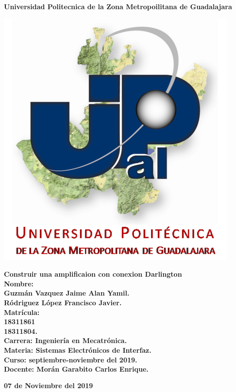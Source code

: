 \documentclass[12pt,a4paper]{article}
\author{Rodriguez Lopez Francisco Javier}
\begin{document}
\begin{center}
\LARGE \textbf{Universidad Politecnica de la Zona Metropoilitana de Guadalajara\\}

\includegraphics[scale=1]{Upzmg7.png} 

\large \textbf{Construir una amplificaion con conexion Darlington}\\
\vspace{1cm}
\large \textbf{Nombre:\\
Guzmán Vazquez Jaime Alan Yamil.\\
Ródriguez López Francisco Javier.\\
\vspace{0.5cm} Matrícula:\\
18311861\\
18311804.\\
\vspace{0.5cm} Carrera: Ingeniería en Mecatrónica.\\
\vspace{0.5cm} Materia: Sistemas Electrónicos de Interfaz.\\
\vspace{0.5cm} Curso: septiembre-noviembre del 2019.\\
\vspace{0.5cm} Docente: Morán Garabito Carlos Enrique.}


\vspace{4cm}
\small \textbf{07 de Noviembre del 2019}
\end{center}
\end{document}
